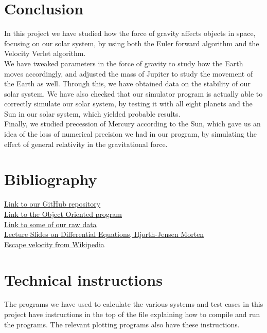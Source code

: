 \documentclass{article}
\begin{document}
\section{Conclusion}
    In this project we have studied how the force of gravity affects objects in space, focusing on our solar system, by using both the Euler forward algorithm and the Velocity Verlet algorithm.\\ We have tweaked parameters in the force of gravity to study how the Earth moves accordingly, and adjusted the mass of Jupiter to study the movement of the Earth as well. Through this, we have obtained data on the stability of our solar system. We have also checked that our simulator program is actually able to correctly simulate our solar system, by testing it with all eight planets and the Sun in our solar system, which yielded probable results.\\
    Finally, we studied precession of Mercury according to the Sun, which gave us an idea of the loss of numerical precision we had in our program, by simulating the effect of general relativity in the gravitational force.

\newpage
\section{Bibliography}
    \href{https://github.com/emmernme/MENA-Compfys/tree/master/Project5/}{Link to our GitHub repository}\\
    \href{https://github.com/emmernme/MENA-Compfys/tree/master/Project5/OO-program/}{Link to the Object Oriented program}\\
    \href{https://github.com/emmernme/MENA-Compfys/tree/master/Project5/raw_data/}{Link to some of our raw data}\\
    \noindent \href{http://compphysics.github.io/ComputationalPhysics/doc/pub/ode/pdf/ode-print.pdf}{Lecture Slides on Differential Equations, Hjorth-Jensen Morten}\\
    \noindent \href{https://en.wikipedia.org/wiki/Escape_velocity}{Escape velocity from Wikipedia}\\

\section{Technical instructions}
    The programs we have used to calculate the various systems and test cases in this project have instructions in the top of the file explaining how to compile and run the programs. The relevant plotting programs also have these instructions.
\end{document}
